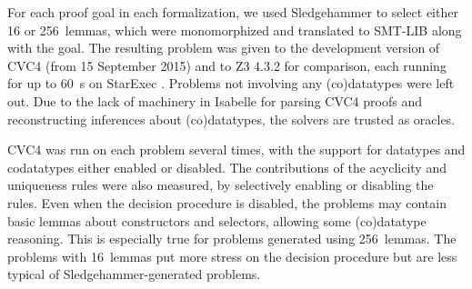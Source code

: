 \documentclass[smallcondensed,draft]{svjour3}
\begin{document}


For each proof goal in each formalization, we used Sledgehammer to select either 16 or
256~lemmas, which were monomorphized and translated to SMT-LIB along with the
goal. The resulting problem was given to the
development version of CVC4
(from 15 September 2015) and to
Z3 4.3.2 for comparison, each running for
up to 60~s on StarExec \cite{stump-et-al-2014-starexec}.
Problems not involving any (co)datatypes were left out.
Due to the lack of machinery in Isabelle for parsing CVC4 proofs and
reconstructing inferences about (co)datatypes, the solvers are trusted
as oracles. %

CVC4 was run on each problem several times, with the
support for datatypes and codatatypes either enabled or disabled. The
contributions of the acyclicity and uniqueness rules were also measured,
by selectively enabling or disabling the rules.
Even when the
decision procedure is disabled, the problems may contain
basic lemmas about constructors and selectors, allowing some (co)datatype
reasoning. This is especially true for problems generated using 256~lemmas.
The problems with 16~lemmas put more stress on the decision procedure but are
less typical of Sledgehammer-generated problems.




\newcommand\nummodden{num\hbox{\rm\_}mod\hbox{\rm\_}den}

\newcommand\captioni{\,Number of solved goals with 16~lemmas per goal}
\newcommand\captionii{\,Number of solved goals with 256~lemmas per goal}
\end{document}
